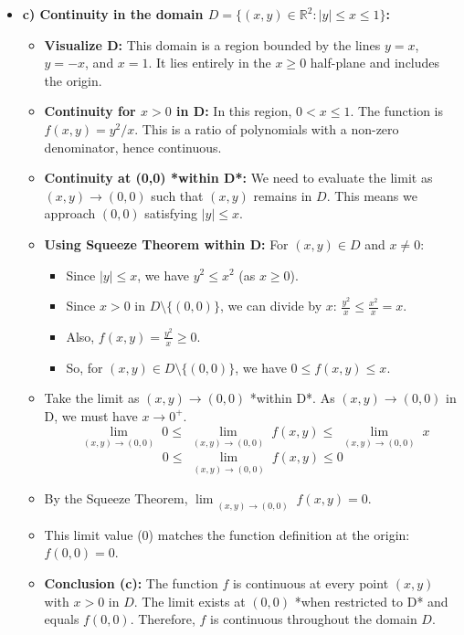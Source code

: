 \begin{cascade}
\begin{itemize}
\begin{itemize}
		      \end{itemize}
		\item \textbf{c) Continuity in the domain $D = \{(x,y) \in \mathbb{R}^2 : |y| \le x \le 1\}$:}
		      \begin{itemize}
			      \item \textbf{Visualize D:} This domain is a region bounded by the lines $y=x$, $y=-x$, and $x=1$. It lies entirely in the $x \ge 0$ half-plane and includes the origin.
			      \item \textbf{Continuity for $x > 0$ in D:} In this region, $0 < x \le 1$. The function is $f(x,y) = y^2/x$. This is a ratio of polynomials with a non-zero denominator, hence continuous.
			      \item \textbf{Continuity at (0,0) *within D*:} We need to evaluate the limit as $(x,y) \to (0,0)$ such that $(x,y)$ remains in $D$. This means we approach $(0,0)$ satisfying $|y| \le x$.
			      \item \textbf{Using Squeeze Theorem within D:} For $(x,y) \in D$ and $x \neq 0$:
			            \begin{itemize}
				            \item Since $|y| \le x$, we have $y^2 \le x^2$ (as $x \ge 0$).
				            \item Since $x > 0$ in $D \setminus \{(0,0)\}$, we can divide by $x$: $\frac{y^2}{x} \le \frac{x^2}{x} = x$.
				            \item Also, $f(x,y) = \frac{y^2}{x} \ge 0$.
				            \item So, for $(x,y) \in D \setminus \{(0,0)\}$, we have $0 \le f(x,y) \le x$.
			            \end{itemize}
			      \item Take the limit as $(x,y) \to (0,0)$ *within D*. As $(x,y) \to (0,0)$ in D, we must have $x \to 0^+$.
			            \[ \lim_{\substack{(x,y) \to (0,0)}} 0 \le \lim_{\substack{(x,y) \to (0,0)}} f(x,y) \le \lim_{\substack{(x,y) \to (0,0)}} x \]
			            \[ 0 \le \lim_{\substack{(x,y) \to (0,0)}} f(x,y) \le 0 \]
			      \item By the Squeeze Theorem, $\lim_{\substack{(x,y) \to (0,0)}} f(x, y) = 0$.
			      \item This limit value (0) matches the function definition at the origin: $f(0,0) = 0$.
			      \item \textbf{Conclusion (c):} The function $f$ is continuous at every point $(x,y)$ with $x>0$ in $D$. The limit exists at $(0,0)$ *when restricted to D* and equals $f(0,0)$. Therefore, $f$ is continuous throughout the domain $D$.
		      \end{itemize}
	\end{itemize}
\end{cascade}

